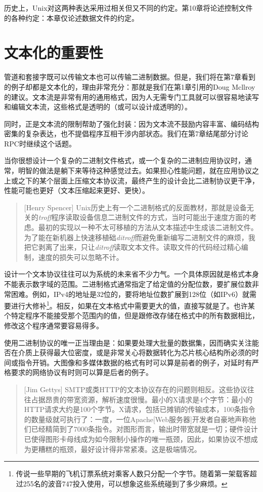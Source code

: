 \documentclass[12pt,oneside]{book}
\begin{document}
\begin{common-format}
历史上，Unix对这两种表达采用过相关但又不同的约定。第10章将论述控制文件的各种约定：本章仅论述数据文件的约定。

\section{文本化的重要性}
管道和套接字既可以传输文本也可以传输二进制数据。但是，我们将在第7章看到的例子却都是文本化的，理由非常充分：那就是我们在第1章引用的Doug Mcllroy的建议。文本流是非常有用的通用格式，因为人无需专门工具就可以很容易地读写和编辑文本流，这些格式是透明的（或可以设计成透明的）。

同时，正是文本流的限制帮助了强化封装：因为文本流不鼓励内容丰富、编码结构密集的复杂表达，也不提倡程序互相干涉内部状态。我们在第7章结尾部分讨论RPC时继续这个话题。

当你很想设计一个复杂的二进制文件格式，或一个复杂的二进制应用协议时，通常，明智的做法是躺下来等待这种感觉过去。如果担心性能问题，就在应用协议之上或之下的某个层面上压缩文本协议流，最终产生的设计会比二进制协议更干净，性能可能也更好（文本压缩起来更好、更快）。

\begin{quote}[Henry Spencer]
Unix历史上有一个二进制格式的反面教材，那就是设备无关的\textit{troff}程序读取设备信息二进制文件的方式，当时可能出于速度方面的考虑。最初的实现以一种不太可移植的方法从文本描述中生成该二进制文件。为了能在新机器上快速移植础\textit{ditroff}而避免重新编写二进制文件的麻烦，我把它剥离了出来，只让\textit{ditroff}读取文本文件。读取文件的代码经过精心编制，速度的损失可以忽略不计。
\end{quote}

设计一个文本协议往往可以为系统的未来省不少力气。一个具体原因就是格式本身不能表示数字域的范围。二进制格式通常指定了给定值的分配位数，要扩展位数非常困难。例如，IPv4的地址是32位的，要将地址位数扩展到128位（如IPv6）就需要进行大修补\footnote{传说一些早期的飞机订票系统对乘客人数只分配一个字节。随着第一架载客超过255名的波音747投入使用，可以想象这些系统碰到了多少麻烦。}。相反，如果在文本格式中需要更大的值，直接写就是了。也许某个特定程序不能接受那个范围内的值，但是跟修改存储在格式中的所有数据相比，修改这个程序通常要容易得多。

使用二进制协议的唯一正当理由是：如果要处理大批量的数据集，因而确实关注能否在介质上获得最大位密度，或是非常关心将数据转化为芯片核心结构所必须的时间或指令开销。大图像和多媒体数据的格式有时可以算是前者的例子，对延时有严格要求的网络协议有时则可以算是后者的例子。

\begin{quote}[Jim Gettys]
SMTP或类HTTP的文本协议存在的问题则相反。这些协议往往占据昂贵的带宽资源，解析速度很慢。最小的X请求是4个字节：最小的HTTP请求大约是100个字节。X请求，包括已摊销的传输成本，100条指令的数量级就可执行了：一度，一位Apache[Web服务器]开发者自豪地声称他们已经精简到了7000条指令。对图形而言，输出时带宽就是一切；硬件设计已使得图形卡母线成为如今限制小操作的唯一瓶颈，因此，如果协议不想成为更糟糕的瓶颈，最好设计得非常紧凑。这是极端情况。
\end{quote}


\end{common-format}
\end{document}
